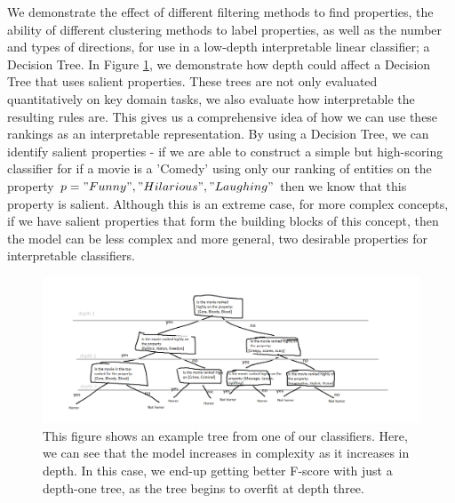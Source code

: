 We demonstrate the effect of different filtering methods to find properties, the ability of different clustering methods to label properties, as well as the number and types of directions, for use in a low-depth interpretable linear classifier; a Decision Tree. In Figure \ref{IntroDecisionTree}, we demonstrate how depth could affect a Decision Tree that uses salient properties. These trees are not only evaluated quantitatively on key domain tasks, we also evaluate how interpretable the resulting rules are. This gives us a comprehensive idea of how we can use these rankings as an interpretable representation. By using a Decision Tree, we can identify salient properties - if we are able to construct a simple but high-scoring classifier for if a movie is a 'Comedy' using only our ranking of entities on the property $p = {"Funny", "Hilarious", "Laughing"}$ then we know that this property is salient. Although this is an extreme case, for more complex concepts, if we have salient properties that form the building blocks of this concept, then the model can be less complex and more general, two desirable properties for interpretable classifiers. 

\begin{figure}[t]
	\includegraphics[width=\textwidth]{images/decisiontree.png}
	\centering
	\caption{This figure shows an example tree from one of our classifiers. Here, we can see that the model increases in complexity as it increases in depth. In this case, we end-up getting better F-score with just a depth-one tree, as the tree begins to overfit at depth three.  }\label{IntroDecisionTree}
\end{figure}



